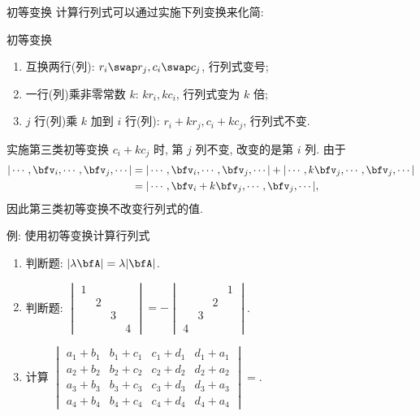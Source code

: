 \begin{frame}{初等变换}
	\onslide<+->
	计算行列式可以通过实施下列变换来化简:
	\onslide<+->
	\begin{third}{初等变换}
		\begin{enumerate}
			\item 互换两行(列): \alert{$r_i\swap r_j, c_i\swap c_j$}, 行列式变号;
			\item 一行(列)乘\alert{非零常数} $k$: \alert{$kr_i, kc_i$}, 行列式变为 $k$ 倍;
			\item $j$ 行(列)乘 $k$ 加到 $i$ 行(列): \alert{$r_i+kr_j, c_i+kc_j$}, 行列式不变.
		\end{enumerate}
	\end{third}
	\onslide<+->
	实施第三类初等变换 $c_i+kc_j$ 时, 第 $j$ 列不变, 改变的是第 $i$ 列.
	\onslide<+->
	由于
	\begin{align*}
		|\cdots,\bfv_i,\cdots,\bfv_j,\cdots|
		&=|\cdots,\bfv_i,\cdots,\bfv_j,\cdots|
		+|\cdots,k\bfv_j,\cdots,\bfv_j,\cdots|\\
		&=|\cdots,\bfv_i+k\bfv_j,\cdots,\bfv_j,\cdots|,
	\end{align*}
	\onslide<+->
	因此第三类初等变换不改变行列式的值.
\end{frame}


\begin{frame}{例: 使用初等变换计算行列式}
	\onslide<+->
	\begin{exercise}
		\begin{enumerate}
			\item 判断题: $|\lambda \bfA|=\lambda|\bfA|$. \visible<+->{\alert{$|\lambda \bfA|=\lambda^n|\bfA|$}}
			\item 判断题: $\begin{vmatrix}
				1&&&\\&2&&\\&&3&\\&&&4
			\end{vmatrix}=-\begin{vmatrix}
				&&&1\\&&2&\\&3&&\\4&&&
			\end{vmatrix}$. \visible<+->{\Huge\alert{$\times$}}
			\item 计算 $\begin{vmatrix}
				a_1+b_1&b_1+c_1&c_1+d_1&d_1+a_1\\
				a_2+b_2&b_2+c_2&c_2+d_2&d_2+a_2\\
				a_3+b_3&b_3+c_3&c_3+d_3&d_3+a_3\\
				a_4+b_4&b_4+c_4&c_4+d_4&d_4+a_4
			\end{vmatrix}=$.
		\end{enumerate}
	\end{exercise}
\end{frame}


